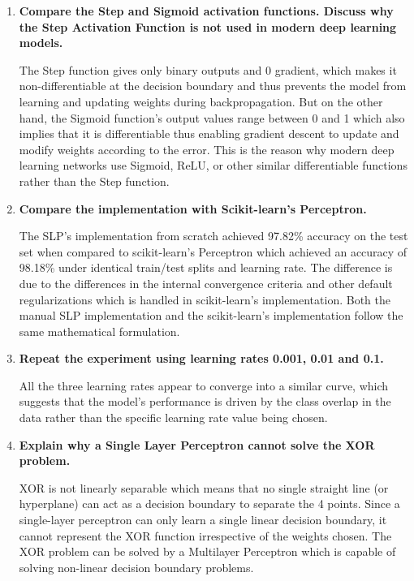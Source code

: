 \documentclass[11pt,a4paper]{article}
\begin{document}
\begin{enumerate}[leftmargin=*]
\item \textbf{Compare the Step and Sigmoid activation functions. Discuss why the Step Activation Function is not used in modern deep learning models.}

The Step function gives only binary outputs and 0 gradient, which makes it non-differentiable at the decision boundary and thus prevents the model from learning and updating weights during backpropagation. But on the other hand, the Sigmoid function's output values range between 0 and 1 which also implies that it is differentiable thus enabling gradient descent to update and modify weights according to the error. This is the reason why modern deep learning networks use Sigmoid, ReLU, or other similar differentiable functions rather than the Step function.

\item \textbf{Compare the implementation with Scikit-learn's Perceptron.}

The SLP's implementation from scratch achieved 97.82\% accuracy on the test set when compared to scikit-learn's Perceptron which achieved an accuracy of 98.18\% under identical train/test splits and learning rate. The difference is due to the differences in the internal convergence criteria and other default regularizations which is handled in scikit-learn's implementation. Both the manual SLP implementation and the scikit-learn's implementation follow the same mathematical formulation.

\item \textbf{Repeat the experiment using learning rates 0.001, 0.01 and 0.1.}

All the three learning rates appear to converge into a similar curve, which suggests that the model's performance is driven by the class overlap in the data rather than the specific learning rate value being chosen.

\item \textbf{Explain why a Single Layer Perceptron cannot solve the XOR problem.}

XOR is not linearly separable which means that no single straight line (or hyperplane) can act as a decision boundary to separate the 4 points. Since a single-layer perceptron can only learn a single linear decision boundary, it cannot represent the XOR function irrespective of the weights chosen. The XOR problem can be solved by a Multilayer Perceptron which is capable of solving non-linear decision boundary problems.


\end{enumerate}
\end{document}
